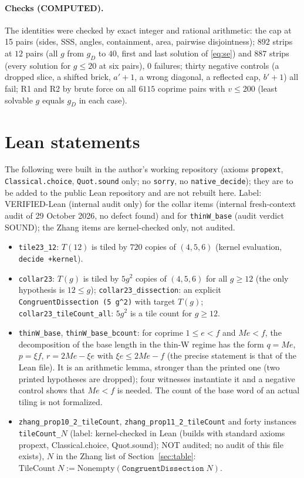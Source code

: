 \documentclass[11pt]{article}
\theoremstyle{remark}
\begin{document}
\paragraph{Checks (COMPUTED).} The identities were checked by exact integer and rational arithmetic: the cap at 15 pairs (sides, SSS, angles, containment, area, pairwise disjointness); $892$ strips at $12$ pairs (all $g$ from $g_D$ to $40$, first and last solution of \eqref{eq:se}) and $887$ strips (every solution for $g\le20$ at six pairs), $0$ failures; thirty negative controls (a dropped slice, a shifted brick, $a'+1$, a wrong diagonal, a reflected cap, $b'+1$) all fail; R1 and R2 by brute force on all $6115$ coprime pairs with $v\le200$ (least solvable $g$ equals $g_D$ in each case).

\sloppy
\section{Lean statements}\label{sec:lean}
The following were built in the author's working repository (axioms \texttt{propext}, \texttt{Classical.choice}, \texttt{Quot.sound} only; no \texttt{sorry}, no \texttt{native\_decide}); they are to be added to the public Lean repository and are not rebuilt here. Label: VERIFIED-Lean (internal audit only) for the collar items (internal fresh-context audit of 29 October 2026, no defect found) and for \texttt{thinW\_base} (audit verdict SOUND); the Zhang items are kernel-checked only, not audited.
\begin{itemize}\sloppy
\item \texttt{tile23\_12}: $T(12)$ is tiled by $720$ copies of $(4,5,6)$ (kernel evaluation, \texttt{decide +kernel}).
\item \texttt{collar23}: $T(g)$ is tiled by $5g^2$ copies of $(4,5,6)$ for all $g\ge12$ (the only hypothesis is $12\le g$); \texttt{collar23\_dissection}: an explicit \texttt{CongruentDissection (5 g\^{}2)} with target $T(g)$; \texttt{collar23\_tileCount\_all}: $5g^2$ is a tile count for $g\ge12$.
\item \texttt{thinW\_base}, \texttt{thinW\_base\_bcount}: for coprime $1\le e<f$ and $Me<f$, the decomposition of the base length in the thin-W regime has the form $q=Me$, $p=\xi f$, $r=2Me-\xi e$ with $\xi e\le 2Me-f$ (the precise statement is that of the Lean file). It is an arithmetic lemma, stronger than the printed one (two printed hypotheses are dropped); four witnesses instantiate it and a negative control shows that $Me<f$ is needed. The count of the base word of an actual tiling is not formalized.
\item \texttt{zhang\_prop10\_2\_tileCount}, \texttt{zhang\_prop11\_2\_tileCount} and forty instances \texttt{tileCount\_$N$} (label: kernel-checked in Lean (builds with standard axioms propext, Classical.choice, Quot.sound); NOT audited; no audit of this file exists), $N$ in the Zhang list of Section~\ref{sec:table}: $\mathrm{TileCount}\;N:=\mathrm{Nonempty}(\texttt{CongruentDissection}\;N)$.
\end{itemize}
\end{document}
